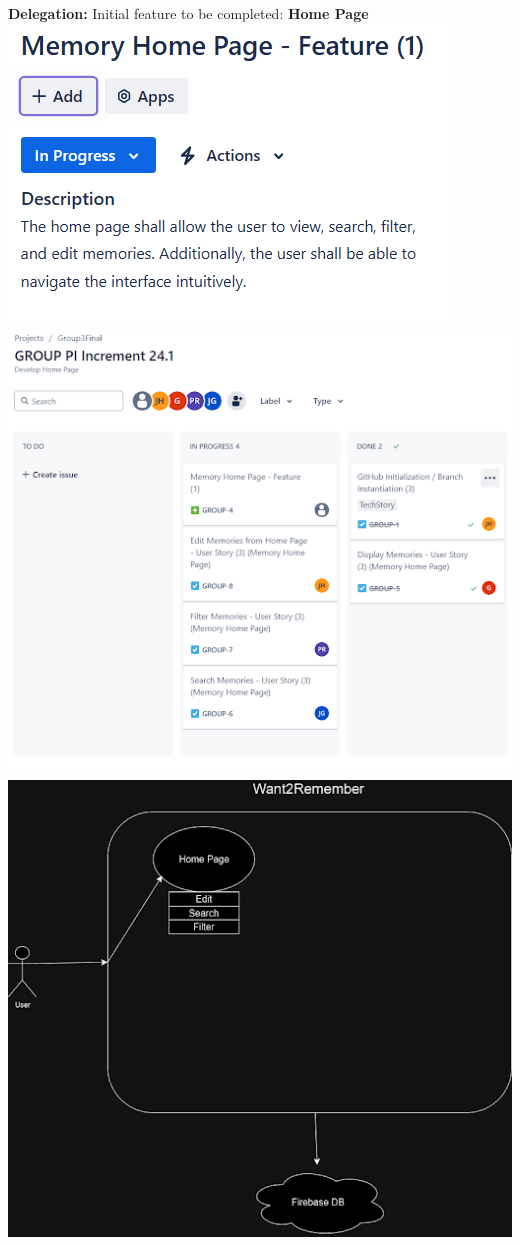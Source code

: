 \documentclass[12pt]{article}
\begin{document}
\textbf{Delegation:} Initial feature to be completed: \textbf{Home Page}\newline
\includegraphics{snapshot1img1.png}\newline
\includegraphics{snapshot1img2.png}
\includegraphics{snapshot1img3.png}
\end{document}
